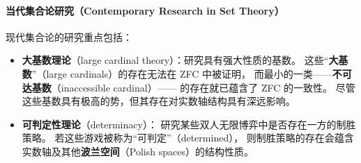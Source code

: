 \paragraph{当代集合论研究（Contemporary Research in Set Theory）}

现代集合论的研究重点包括：
\begin{itemize}
  \item \textbf{大基数理论}（large cardinal theory）：研究具有强大性质的基数。  
  这些“\textbf{大基数}”（large cardinals）的存在无法在 ZFC 中被证明，  
  而最小的一类——\textbf{不可达基数}（inaccessible cardinal）——
  的存在就已蕴含了 ZFC 的一致性。
  尽管这些基数具有极高的势，但其存在对实数轴结构具有深远影响。

  \item \textbf{可判定性理论}（determinacy）：  
  研究某些双人无限博弈中是否存在一方的制胜策略。  
  若这些游戏被称为“可判定”（determined），
  则制胜策略的存在会蕴含实数轴及其他\textbf{波兰空间}（Polish spaces）的结构性质。
\end{itemize}
